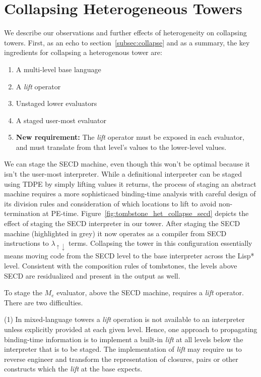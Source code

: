 \documentclass[sigplan,anonymous,review]{acmart}
\newcommand{\mslang}{$\lambda_{\uparrow\downarrow}$}
\newcommand{\mevl}{$M_{e}$}
\theoremstyle{definition}
\begin{document}
\section{Collapsing Heterogeneous Towers}\label{subsec:collapseh}
We describe our observations and further effects of heterogeneity on collapsing towers.
First, as an echo to section~\ref{subsec:collapse} and as a summary, the key ingredients for collapsing a heterogenous tower are:
\begin{enumerate}
    \item A multi-level base language
    \item A \textit{lift} operator
    \item Unstaged lower evaluators
    \item A staged user-most evaluator
    \item \textbf{New requirement: } The \textit{lift} operator must be exposed in each evaluator, and must translate from that level's values to the lower-level values.
\end{enumerate}

We can stage the SECD machine, even though this won't be optimal because it isn't the user-most interpreter.
While a definitional interpreter can be staged using TDPE by simply lifting values it returns, the process of staging an abstract machine requires a more sophisticaed binding-time analysis with careful design of its division rules
and consideration of which locations to lift to avoid non-termination at PE-time. Figure~\ref{fig:tombstone_het_collapse_secd} depicts the effect of staging the SECD interpreter in our tower. After staging the SECD machine (highlighted in grey) it now operates as a compiler from SECD instructions to \mslang{} terms. Collapsing the tower in this configuration essentially means moving code from the SECD level to the base interpreter across the Lisp* level. Consistent with the composition rules of tombstones, the levels above SECD are residualized and present in the output as well.

To stage the \mevl{} evaluator, above the SECD machine, requires a \textit{lift} operator. There are two difficulties.

(1) In mixed-language towers a \textit{lift} operation is not available to an interpreter unless explicitly provided at each given level.
Hence, one approach to propagating binding-time information is to implement a built-in \textit{lift} at all levels below the interpreter that is to be staged. The implementation of \textit{lift} may require us to reverse engineer and transform the representation of closures, pairs or other constructs which the \textit{lift} at the base expects.
\end{document}

